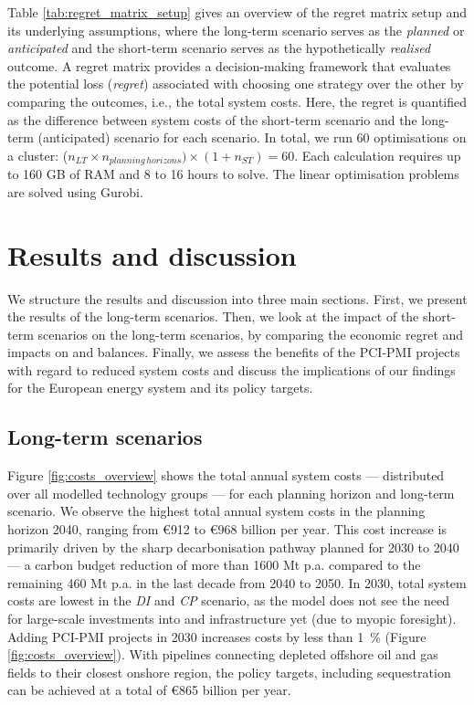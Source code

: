\documentclass[preprint,12pt,sort&compress]{elsarticle}
\begin{document}
Table \ref{tab:regret_matrix_setup} gives an overview of the regret matrix setup and its underlying assumptions, where the long-term scenario serves as the \textit{planned} or \textit{anticipated} and the short-term scenario serves as the hypothetically \textit{realised} outcome. A regret matrix provides a decision-making framework that evaluates the potential loss (\textit{regret}) associated with choosing one strategy over the other by comparing the outcomes, i.e., the total system costs. Here, the regret is quantified as the difference between system costs of the short-term scenario and the long-term (anticipated) scenario for each scenario. 
In total, we run 60 optimisations on a cluster: ($n_{LT} \times n_{planning\,horizons}) \times (1+n_{ST}) = 60$. Each calculation requires up to 160 GB of RAM and 8 to 16 hours to solve. The linear optimisation problems are solved using Gurobi.

\section{Results and discussion}
\label{sec:results_and_discussion}
We structure the results and discussion into three main sections. First, we present the results of the long-term scenarios. Then, we look at the impact of the short-term scenarios on the long-term scenarios, by comparing the economic regret and impacts on  and  balances. Finally, we assess the benefits of the PCI-PMI projects with regard to reduced system costs and discuss the implications of our findings for the European energy system and its policy targets. 

\subsection{Long-term scenarios}
\label{sec:long-term_scenarios}
Figure \ref{fig:costs_overview} shows the total annual system costs --- distributed over all modelled technology groups --- for each planning horizon and long-term scenario. We observe the highest total annual system costs in the planning horizon 2040, ranging from \euro{912} to \euro{968} billion per year. This cost increase is primarily driven by the sharp decarbonisation pathway planned for 2030 to 2040 --- a carbon budget reduction of more than 1600 Mt p.a. compared to the remaining 460 Mt p.a. in the last decade from 2040 to 2050. In 2030, total system costs are lowest in the \textit{DI} and \textit{CP} scenario, as the model does not see the need for large-scale investments into  and  infrastructure yet (due to myopic foresight). Adding PCI-PMI projects in 2030 increases costs by less than \SI{1}{\percent} (Figure \ref{fig:costs_overview}). With  pipelines connecting depleted offshore oil and gas fields to their closest onshore region, the policy targets, including  sequestration can be achieved at a total of \euro{865} billion per year.
\end{document}
